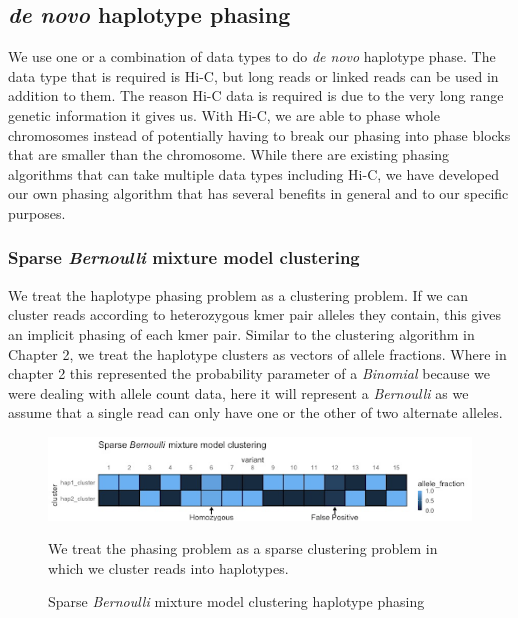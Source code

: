 \subsection{\textit{de novo} haplotype phasing}

\par{
We use one or a combination of data types to do \textit{de novo} haplotype phase. The data type that is required is Hi-C, but long reads or linked reads can be used in addition to them. The reason Hi-C data is required is due to the very long range genetic information it gives us. With Hi-C, we are able to phase whole chromosomes instead of potentially having to break our phasing into phase blocks that are smaller than the chromosome. While there are existing phasing algorithms that can take multiple data types including Hi-C\cite{hapcut2}\cite{HICphasing}, we have developed our own phasing algorithm that has several benefits in general and to our specific purposes.
}

\subsubsection{Sparse \textit{Bernoulli} mixture model clustering}

\par{
We treat the haplotype phasing problem as a clustering problem. If we can cluster reads according to heterozygous kmer pair alleles they contain, this gives an implicit phasing of each kmer pair. Similar to the clustering algorithm in Chapter 2, we treat the haplotype clusters as vectors of allele fractions. Where in chapter 2 this represented the probability parameter of a \textit{Binomial} because we were dealing with allele count data, here it will represent a \textit{Bernoulli} as we assume that a single read can only have one or the other of two alternate alleles.
}

\begin{figure}[htbp!]

\caption{Sparse \textit{Bernoulli} mixture model clustering haplotype phasing}
\label{figure:scaff}
\begin{centering}
\includegraphics[width=\textwidth]{sparsebernoulli.png}
\par{We treat the phasing problem as a sparse clustering problem in which we cluster reads into haplotypes.}
\end{centering}
\end{figure}


